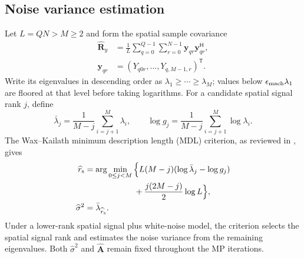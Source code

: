 \subsection{Noise variance estimation}
Let $L=QN>M\geq2$ and form the spatial sample covariance
\begin{equation}
 \begin{aligned}
 \widehat{\mathbf R}_y&=\frac1L\sum_{q=0}^{Q-1}\sum_{r=0}^{N-1}
 \mathbf y_{qr}\mathbf y_{qr}^{\mathsf H},\\
 \mathbf y_{qr}&=(Y_{q0r},\ldots,Y_{q,M-1,r})^{\mathsf T}.
 \end{aligned}
 \label{eq:spatial-noise-covariance}
\end{equation}
Write its eigenvalues in descending order as
$\lambda_1\geq\cdots\geq\lambda_M$; values below
$\epsilon_{\rm mach}\lambda_1$ are floored at that level before
taking logarithms. For a candidate spatial signal rank $j$, define
\begin{equation}
 \bar\lambda_j=\frac1{M-j}\sum_{i=j+1}^M\lambda_i,\qquad
 \log g_j=\frac1{M-j}\sum_{i=j+1}^M\log\lambda_i.
 \label{eq:noise-tail-statistics}
\end{equation}
The Wax--Kailath minimum description length (MDL) criterion, as reviewed
in \cite{nadakuditi2008}, gives
\begin{equation}
 \begin{aligned}
 \widehat r_{\rm s}
 &=\arg\min_{0\leq j<M}\Big\{
 L(M-j)(\log\bar\lambda_j-\log g_j)\\
 &\hspace{6em}+\frac{j(2M-j)}2\log L\Big\},\\
 \widehat\sigma^2&=\bar\lambda_{\widehat r_{\rm s}}.
 \end{aligned}
 \label{eq:noise-mdl}
\end{equation}
Under a lower-rank spatial signal plus white-noise model, the criterion
selects the spatial signal rank and estimates the noise variance from
the remaining eigenvalues. Both $\widehat\sigma^2$ and
$\widehat{\mathbf A}$ remain fixed throughout the MP iterations.


